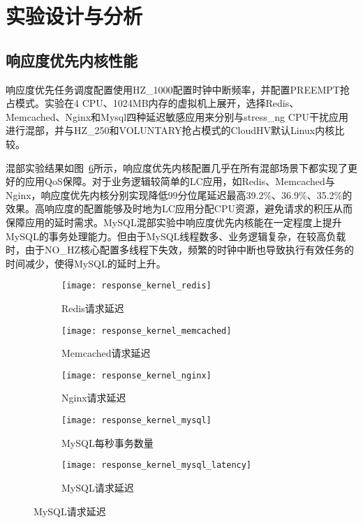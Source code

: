 
\section{实验设计与分析}

\subsection{响应度优先内核性能}


响应度优先任务调度配置使用HZ\_1000配置时钟中断频率，并配置PREEMPT抢占模式。实验在4 CPU、1024MB内存的虚拟机上展开，选择Redis、Memcached、Nginx和Mysql四种延迟敏感应用来分别与stress\_ng CPU干扰应用进行混部，并与HZ\_250和VOLUNTARY抢占模式的CloudHV默认Linux内核比较。

混部实验结果如图~\ref{fig:perf_response}所示，响应度优先内核配置几乎在所有混部场景下都实现了更好的应用QoS保障。对于业务逻辑较简单的LC应用，如Redis、Memcached与Nginx，响应度优先内核分别实现降低99分位尾延迟最高39.2\%、36.9\%、35.2\%的效果。高响应度的配置能够及时地为LC应用分配CPU资源，避免请求的积压从而保障应用的延时需求。MySQL混部实验中响应度优先内核能在一定程度上提升MySQL的事务处理能力。但由于MySQL线程数多、业务逻辑复杂，在较高负载时，由于NO\_HZ核心配置多线程下失效，频繁的时钟中断也导致执行有效任务的时间减少，使得MySQL的延时上升。

\begin{figure}[H]
    \centering
    \begin{subfigure}[b]{0.32\textwidth}
      \texttt{[image: response\_kernel\_redis]}
      \caption{Redis请求延迟}
      \label{fig:response_kernel_redis}
    \end{subfigure}
    \begin{subfigure}[b]{0.32\textwidth}
      \texttt{[image: response\_kernel\_memcached]}
      \caption{Memcached请求延迟}
      \label{fig:response_kernel_memcached}
    \end{subfigure}
    \begin{subfigure}[b]{0.32\textwidth}
        \texttt{[image: response\_kernel\_nginx]}
        \caption{Nginx请求延迟}
        \label{fig:memcached_response}
      \end{subfigure}
      \begin{subfigure}[b]{0.32\textwidth}
        \texttt{[image: response\_kernel\_mysql]}
        \caption{\quad MySQL每秒事务数量}
        \label{fig:memcached_response}
      \end{subfigure}
      \begin{subfigure}[b]{0.32\textwidth}
        \texttt{[image: response\_kernel\_mysql\_latency]}
        \caption{MySQL请求延迟}
        \label{fig:memcached_response}
      \end{subfigure}
    \label{fig:perf_response}
\end{figure}

